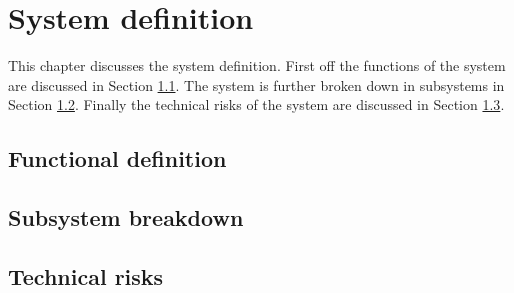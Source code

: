\section{System definition}\label{cha:sysdef}

This chapter discusses the system definition. First off the functions of the system are discussed in Section \ref{sec:funcdef}. The system is further broken down in subsystems in Section \ref{sec:subsysbreak}. Finally the technical risks of the system are discussed in Section \ref{sec:sysrisk}.


\subsection{Functional definition} \label{sec:funcdef}


\subsection{Subsystem breakdown} \label{sec:subsysbreak}


\clearpage
\subsection{Technical risks} \label{sec:sysrisk}

